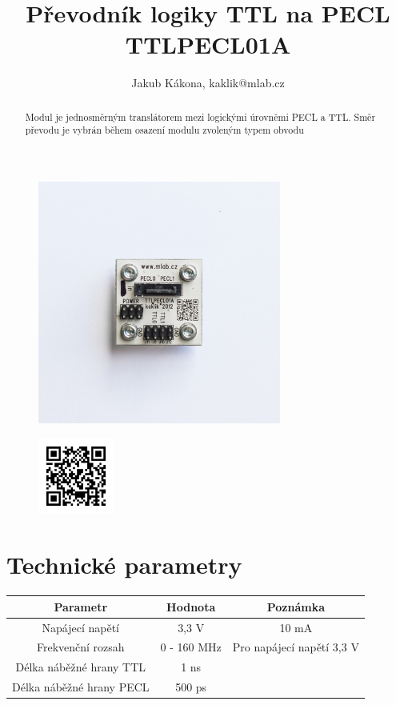 \documentclass[12pt,a4paper,oneside]{article}
\begin{document}
\title{Převodník logiky TTL na PECL TTLPECL01A}
\author{Jakub Kákona, kaklik@mlab.cz}
\maketitle

\thispagestyle{empty}
\begin{abstract}
Modul je jednosměrným translátorem mezi logickými úrovněmi
PECL a TTL. Směr převodu je vybrán během osazení modulu zvoleným typem obvodu
\end{abstract}

\begin{figure} [htbp]
\begin{center}
\includegraphics [width=80mm] {./img/TTLPECL01A_Top_Big2.jpg} 
\end{center}
\end{figure}

\begin{figure} [b]
\includegraphics [width=25mm] {./img/TTLPECL01A_QRcode.png} 
\end{figure}

\newpage
\tableofcontents


\section{Technické parametry}
\begin{table}[htbp]
\begin{center}
\begin{tabular}{|c|c|c|}
\hline
\multicolumn{1}{|c|}{Parametr} & \multicolumn{1}{|c|}{Hodnota} & \multicolumn{1}{|c|}{Poznámka} \\ \hline
Napájecí napětí & 3,3 V &  10 mA \\ \hline
Frekvenční rozsah  & 0 - 160 MHz & Pro napájecí napětí 3,3 V \\ \hline
Délka náběžné hrany TTL  & 1 ns & \\ \hline
Délka náběžné hrany PECL  & 500 ps & \\ \hline
\end{tabular}
\end{center}
\end{table}
\end{document}
